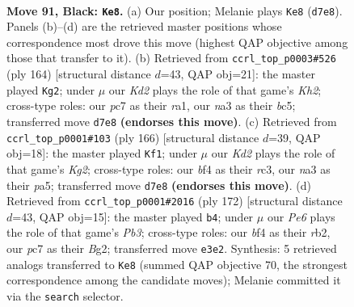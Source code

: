 \documentclass[11pt]{article}
\begin{document}
\clearpage

\begin{figure}[p]\centering
\begin{subfigure}{0.46\textwidth}\centering
\resizebox{\linewidth}{!}{%
\newchessgame
\chessboard[
  setfen={2n3K1/2Pk4/p7/P4p1p/5Bb1/Nr2p1P1/8/R7 b - - 1 91},
  showmover=false,
  pgfstyle=straightmove, color=movearrow, markmove={d7-e8}
]}
\caption{}
\end{subfigure}\hfill
\begin{subfigure}{0.46\textwidth}\centering
\resizebox{\linewidth}{!}{%
\newchessgame
\chessboard[
  setfen={8/7p/1p3k2/1BbR1p1P/P1P2P2/8/7K/r7 w - - 85 83},
  showmover=false,
  pgfstyle=straightmove, color=movearrow, markmove={h2-g2}
]}
\caption{}
\end{subfigure}
\\[4pt]
\begin{subfigure}{0.46\textwidth}\centering
\resizebox{\linewidth}{!}{%
\newchessgame
\chessboard[
  setfen={8/2b1k3/5p2/pR3B1p/P3P2P/1Pr5/6K1/8 w - - 3 84},
  showmover=false,
  pgfstyle=straightmove, color=movearrow, markmove={g2-f1}
]}
\caption{}
\end{subfigure}\hfill
\begin{subfigure}{0.46\textwidth}\centering
\resizebox{\linewidth}{!}{%
\newchessgame
\chessboard[
  setfen={5k2/1R6/1p5p/2b3p1/P5P1/1P5P/1r4BK/8 w - - 69 87},
  showmover=false,
  pgfstyle=straightmove, color=movearrow, markmove={b3-b4}
]}
\caption{}
\end{subfigure}
\caption{\textbf{Move 91, Black: \texttt{Ke8}.} (a) Our position; Melanie plays \texttt{Ke8} (\texttt{d7e8}). Panels (b)--(d) are the retrieved master positions whose correspondence most drove this move (highest QAP objective among those that transfer to it). (b) Retrieved from \texttt{ccrl\_top\_p0003\#526} (ply 164) [structural distance $d$=43, QAP obj=21]: the master played \texttt{Kg2}; under $\mu$ our \emph{Kd2} plays the role of that game's \emph{Kh2}; cross-type roles: our \emph{p}c7 as their \emph{r}a1, our \emph{n}a3 as their \emph{b}c5; transferred move \texttt{d7e8} \textbf{(endorses this move)}. (c) Retrieved from \texttt{ccrl\_top\_p0001\#103} (ply 166) [structural distance $d$=39, QAP obj=18]: the master played \texttt{Kf1}; under $\mu$ our \emph{Kd2} plays the role of that game's \emph{Kg2}; cross-type roles: our \emph{b}f4 as their \emph{r}c3, our \emph{n}a3 as their \emph{p}a5; transferred move \texttt{d7e8} \textbf{(endorses this move)}. (d) Retrieved from \texttt{ccrl\_top\_p0001\#2016} (ply 172) [structural distance $d$=43, QAP obj=15]: the master played \texttt{b4}; under $\mu$ our \emph{Pe6} plays the role of that game's \emph{Pb3}; cross-type roles: our \emph{b}f4 as their \emph{r}b2, our \emph{p}c7 as their \emph{B}g2; transferred move \texttt{e3e2}. Synthesis: 5 retrieved analogs transferred to \texttt{Ke8} (summed QAP objective 70, the strongest correspondence among the candidate moves); Melanie committed it via the \texttt{search} selector.}
\label{fig:thought-m181}
\end{figure}
\end{document}
